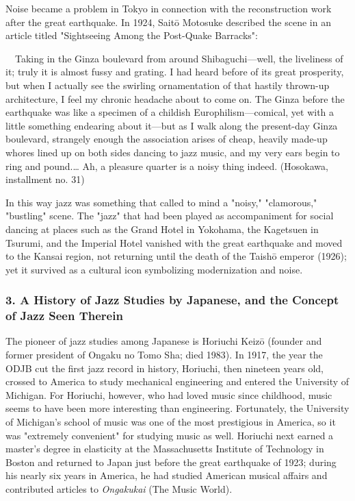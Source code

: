 Noise became a problem in Tokyo in connection with the reconstruction work after the great earthquake. In 1924, Saitō Motosuke described the scene in an article titled "Sightseeing Among the Post-Quake Barracks":

\begin{gquote}
　Taking in the Ginza boulevard from around Shibaguchi—well, the liveliness of it; truly it is almost fussy and grating. I had heard before of its great prosperity, but when I actually see the swirling ornamentation of that hastily thrown-up architecture, I feel my chronic headache about to come on. The Ginza before the earthquake was like a specimen of a childish Europhilism—comical, yet with a little something endearing about it—but as I walk along the present-day Ginza boulevard, strangely enough the association arises of cheap, heavily made-up whores lined up on both sides dancing to jazz music, and my very ears begin to ring and pound.… Ah, a pleasure quarter is a noisy thing indeed. (Hosokawa, installment no. 31)
\end{gquote}

In this way jazz was something that called to mind a "noisy," "clamorous," "bustling" scene. The "jazz" that had been played as accompaniment for social dancing at places such as the Grand Hotel in Yokohama, the Kagetsuen in Tsurumi, and the Imperial Hotel vanished with the great earthquake and moved to the Kansai region, not returning until the death of the Taishō emperor (1926); yet it survived as a cultural icon symbolizing modernization and noise.

\subsubsection{3. A History of Jazz Studies by Japanese, and the Concept of Jazz Seen Therein}

The pioneer of jazz studies among Japanese is Horiuchi Keizō (founder and former president of Ongaku no Tomo Sha; died 1983). In 1917, the year the ODJB cut the first jazz record in history, Horiuchi, then nineteen years old, crossed to America to study mechanical engineering and entered the University of Michigan. For Horiuchi, however, who had loved music since childhood, music seems to have been more interesting than engineering. Fortunately, the University of Michigan's school of music was one of the most prestigious in America, so it was "extremely convenient" for studying music as well. Horiuchi next earned a master's degree in elasticity at the Massachusetts Institute of Technology in Boston and returned to Japan just before the great earthquake of 1923; during his nearly six years in America, he had studied American musical affairs and contributed articles to \textit{Ongakukai} (The Music World).

